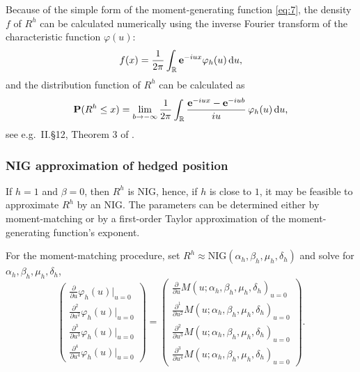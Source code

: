 Because of the simple form of the moment-generating function
\eqref{eq:7}, the density $f$ of $R^h$ can be calculated numerically
using the inverse Fourier transform of the characteristic function
$\varphi(u) $:
\begin{equation*}
  f(x) = \frac{1}{2\pi} \int_{\mathbb{R}} {\bf e}^{-i u x} \varphi_h(u)\, {\rm d} u, 
\end{equation*}
and the distribution function of $R^h$ can be calculated as
\begin{equation*}
  {\bf P}(R^h\leq x) = \lim_{b\rightarrow-\infty} \frac{1}{2\pi} \int_{\mathbb{R}}
  \frac{{\bf e}^{-i u x} - {\bf e}^{-i u b}}{i u}\, \varphi_h(u)\, {\rm d} u,
\end{equation*}
see e.g.\ II.\S 12, Theorem 3 of \citep{Shiryaev1996}.


\subsubsection{NIG approximation of hedged position}
\label{sec:nig-appr-hedg}

If $h=1$ and $\beta=0$, then $R^h$ is NIG, hence, if $h$ is close to
$1$, it may be feasible to approximate $R^h$ by an NIG. The parameters
can be determined either by moment-matching or by a first-order Taylor
approximation of the moment-generating function's exponent.


For the moment-matching procedure, set
$R^h\approx \text{NIG}(\alpha_h, \beta_h, \mu_h, \delta_h)$ and solve
for $\alpha_h, \beta_h, \mu_h, \delta_h$, 
\begin{equation*}
  \begin{pmatrix}
    \frac{\partial}{\partial u} \varphi_h(u)\big|_{u=0}\\[5pt]
    \frac{\partial^2}{\partial u^2} \varphi_h(u)\big|_{u=0}\\[5pt]
    \frac{\partial^3}{\partial u^3} \varphi_h(u)\big|_{u=0}\\[5pt]
    \frac{\partial^4}{\partial u^4} \varphi_h(u)\big|_{u=0}
  \end{pmatrix}
  =
  \begin{pmatrix}
    \frac{\partial}{\partial u} M(u;\alpha_h, \beta_h, \mu_h,
    \delta_h)_{u=0}\\[5pt]
    \frac{\partial^1}{\partial u^2} M(u;\alpha_h, \beta_h, \mu_h,
    \delta_h)_{u=0}\\[5pt]
    \frac{\partial^2}{\partial u^3} M(u;\alpha_h, \beta_h, \mu_h,
    \delta_h)_{u=0}\\[5pt]
    \frac{\partial^3}{\partial u^4} M(u;\alpha_h, \beta_h, \mu_h,
    \delta_h)_{u=0}
  \end{pmatrix}.
\end{equation*}

